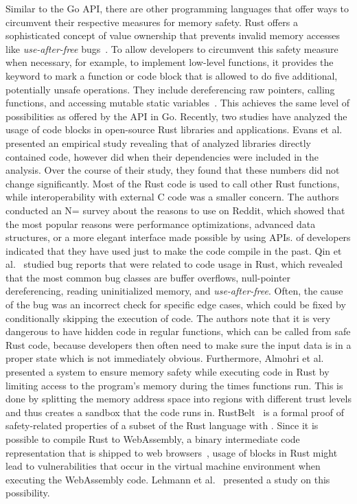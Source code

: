 Similar to the Go \unsafe{} \acrshort{API}, there are other programming languages that offer ways to circumvent their
respective measures for memory safety.
Rust offers a sophisticated concept of value ownership that prevents invalid memory accesses like
\textit{use-after-free} bugs~\cite{matsakis2014}.
To allow developers to circumvent this safety measure when necessary, for example, to implement low-level functions, it
provides the \unsafe{} keyword to mark a function or code block that is allowed to do five additional, potentially
unsafe operations.
They include dereferencing raw pointers, calling \unsafe{} functions, and accessing mutable static
variables~\cite{matsakis2014}.
This achieves the same level of possibilities as offered by the \unsafe{} \acrshort{API} in Go.
Recently, two studies have analyzed the usage of \unsafe{} code blocks in open-source Rust libraries and applications.
Evans et al.~\cite{evans2020} presented an empirical study revealing that  of analyzed
libraries directly contained \unsafe{} code, however  did when their dependencies were included
in the analysis.
Over the course of their  study, they found that these numbers did not change significantly.
Most of the \unsafe{} Rust code is used to call other Rust functions, while interoperability with external C code was a
smaller concern.
The authors conducted an N= survey about the reasons to use \unsafe{} on Reddit, which showed that the most
popular reasons were performance optimizations, advanced data structures, or a more elegant interface made possible by
using \unsafe{} \acrshort{API}s.
 of developers indicated that they have used \unsafe{} just to make the code compile in the past.
Qin et al.~\cite{qin2020} studied bug reports that were related to \unsafe{} code usage in Rust, which revealed that the
most common bug classes are buffer overflows, null-pointer dereferencing, reading uninitialized memory, and
\textit{use-after-free}.
Often, the cause of the bug was an incorrect check for specific edge cases, which could be fixed by conditionally
skipping the execution of \unsafe{} code.
The authors note that it is very dangerous to have hidden \unsafe{} code in regular functions, which can be called from
safe Rust code, because developers then often need to make sure the input data is in a proper state which is not
immediately obvious.
Furthermore, Almohri et al.~\cite{almohri2018} presented a system to ensure memory safety while executing \unsafe{} code
in Rust by limiting access to the program's memory during the times \unsafe{} functions run.
This is done by splitting the memory address space into regions with different trust levels and thus creates a sandbox
that the \unsafe{} code runs in.
RustBelt~\cite{jung2017} is a formal proof of safety-related properties of a subset of the Rust language with \unsafe{}.
Since it is possible to compile Rust to WebAssembly, a binary intermediate code representation that is shipped to web
browsers~\cite{rourke2018}, usage of \unsafe{} blocks in Rust might lead to vulnerabilities that occur in the virtual
machine environment when executing the WebAssembly code.
Lehmann et al.~\cite{lehmann2020} presented a study on this possibility.

